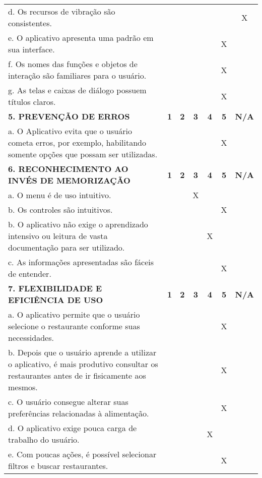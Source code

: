 \documentclass[portuguese,oneside]{tcc}
\begin{document}
\begin{table}[h]
{\begin{tabu}{|L{25em}|c|c|c|c|c|c|}
							d. Os recursos de vibração são consistentes. & & & & & & X \\ 
							e. O aplicativo apresenta uma padrão em sua interface. & & & & & X & \\ 
							f. Os nomes das funções e objetos de interação são familiares para o usuário. & & & & & X & \\ 
							g. As telas e caixas de diálogo possuem títulos claros. & & & & & X & \\ 
							\textbf{5. PREVENÇÃO DE ERROS} & \textbf{1} & \textbf{2} & \textbf{3} & \textbf{4} & \textbf{5} & \textbf{N/A} \\ 
							a. O Aplicativo evita que o usuário cometa erros, por exemplo, habilitando somente opções que possam ser utilizadas. & & & & & X & \\ 
							\textbf{6. RECONHECIMENTO AO INVÉS DE MEMORIZAÇÃO} & \textbf{1} & \textbf{2} & \textbf{3} & \textbf{4} & \textbf{5} & \textbf{N/A} \\ 
							a. O  menu é de uso intuitivo. & & & X & & & \\ 
							b. Os controles são intuitivos. & & & & & X & \\ 
							b. O aplicativo não exige o aprendizado intensivo ou leitura de vasta documentação para ser utilizado. & & & & X & & \\ 
							c. As informações apresentadas são fáceis de entender. & & & & & X & \\ 
							\textbf{7. FLEXIBILIDADE E EFICIÊNCIA DE USO} & \textbf{1} & \textbf{2} & \textbf{3} & \textbf{4} & \textbf{5} & \textbf{N/A} \\ 
							a. O aplicativo permite que o usuário selecione o restaurante conforme suas necessidades. & & & & & X & \\ 
							b. Depois que o usuário aprende a utilizar o aplicativo, é mais produtivo consultar os restaurantes antes de ir fisicamente aos mesmos. & & & & & X & \\ 
							c. O usuário consegue alterar suas preferências relacionadas à alimentação. & & & & & X & \\ 
							d. O aplicativo exige pouca carga de trabalho do usuário. & & & & X & & \\ 
							e. Com poucas ações, é possível selecionar filtros e buscar restaurantes. & & & & & X & \\ 

\end{tabu}}
\end{table}
\end{document}
